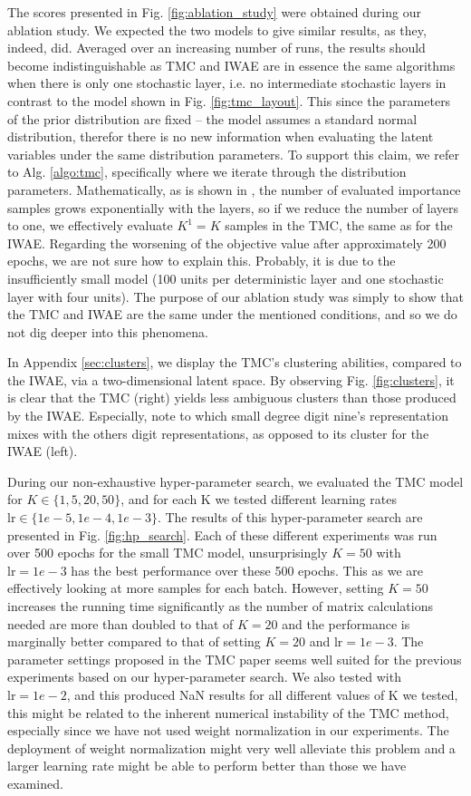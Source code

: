 The scores presented in Fig. \ref{fig:ablation_study} were obtained during our ablation study. We expected the two models to give similar results, as they, indeed, did. Averaged over an increasing number of runs, the results should become indistinguishable as TMC and IWAE are in essence the same algorithms when there is only one stochastic layer, i.e. no intermediate stochastic layers in contrast to the model shown in Fig. \ref{fig:tmc_layout}. This since the parameters of the prior distribution are fixed – the model assumes a standard normal distribution, therefor there is no new information when evaluating the latent variables under the same distribution parameters. To support this claim, we refer to Alg. \ref{algo:tmc}, specifically where we iterate through the distribution parameters. Mathematically, as is shown in \cite{tmc}, the number of evaluated importance samples grows exponentially with the layers, so if we reduce the number of layers to one, we effectively evaluate $K^1=K$ samples in the TMC, the same as for the IWAE. Regarding the worsening of the objective value after approximately 200 epochs, we are not sure how to explain this. Probably, it is due to the insufficiently small model (100 units per deterministic layer and one stochastic layer with four units). The purpose of our ablation study was simply to show that the TMC and IWAE are the same under the mentioned conditions, and so we do not dig deeper into this phenomena.

In Appendix \ref{sec:clusters}, we display the TMC's clustering abilities, compared to the IWAE, via a two-dimensional latent space. By observing Fig. \ref{fig:clusters}, it is clear that the TMC (right) yields less ambiguous clusters than those produced by the IWAE. Especially, note to which small degree digit nine's representation mixes with the others digit representations, as opposed to its cluster for the IWAE (left).

During our non-exhaustive hyper-parameter search, we evaluated the TMC model for $K\in\{1, 5, 20, 50\}$, and for each K we tested different learning rates $\text{lr}\in\{1e-5, 1e-4, 1e-3\}$. The results of this hyper-parameter search are presented in Fig. \ref{fig:hp_search}. Each of these different experiments was run over 500 epochs for the small TMC model, unsurprisingly $K=50$ with $\text{lr}=1e-3$ has the best performance over these 500 epochs. This as we are effectively looking at more samples for each batch. However, setting $K=50$ increases the running time significantly as the number of matrix calculations needed are more than doubled to that of $K=20$ and the performance is marginally better compared to that of setting $K=20$ and $\text{lr}=1e-3$. The parameter settings proposed in the TMC paper seems well suited for the previous experiments based on our hyper-parameter search. We also tested with $\text{lr}=1e-2$, and this produced NaN results for all different values of K we tested, this might be related to the inherent numerical instability of the TMC method, especially since we have not used weight normalization in our experiments. The deployment of weight normalization might very well alleviate this problem and a larger learning rate might be able to perform better than those we have examined. 


